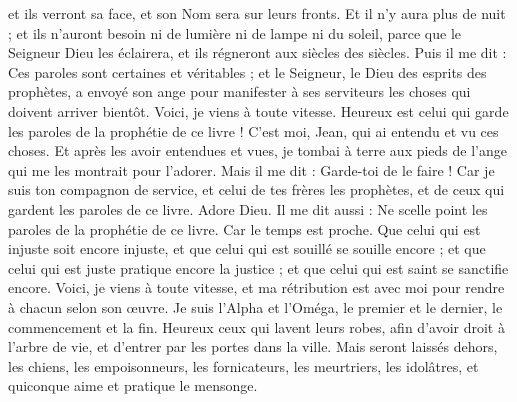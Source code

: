 \begin{multicols}{2}
et ils verront sa face, et son Nom sera sur leurs fronts.
Et il n'y aura plus de nuit ; et ils n'auront besoin ni de lumière ni de lampe ni du soleil, parce que le Seigneur Dieu les éclairera, et ils régneront aux siècles des siècles.
Puis il me dit : Ces paroles sont certaines et véritables ; et le Seigneur, le Dieu des esprits des prophètes, a envoyé son ange pour manifester à ses serviteurs les choses qui doivent arriver bientôt.
Voici, je viens à toute vitesse. Heureux est celui qui garde les paroles de la prophétie de ce livre !
C'est moi, Jean, qui ai entendu et vu ces choses. Et après les avoir entendues et vues, je tombai à terre aux pieds de l'ange qui me les montrait pour l'adorer.
Mais il me dit : Garde-toi de le faire ! Car je suis ton compagnon de service, et celui de tes frères les prophètes, et de ceux qui gardent les paroles de ce livre. Adore Dieu.
Il me dit aussi : Ne scelle point les paroles de la prophétie de ce livre. Car le temps est proche.
Que celui qui est injuste soit encore injuste, et que celui qui est souillé se souille encore ; et que celui qui est juste pratique encore la justice ; et que celui qui est saint se sanctifie encore.
Voici, je viens à toute vitesse, et ma rétribution est avec moi pour rendre à chacun selon son œuvre.
Je suis l'Alpha et l'Oméga, le premier et le dernier, le commencement et la fin.
Heureux ceux qui lavent leurs robes, afin d'avoir droit à l'arbre de vie, et d'entrer par les portes dans la ville.
Mais seront laissés dehors, les chiens, les empoisonneurs, les fornicateurs, les meurtriers, les idolâtres, et quiconque aime et pratique le mensonge.

\end{multicols}
